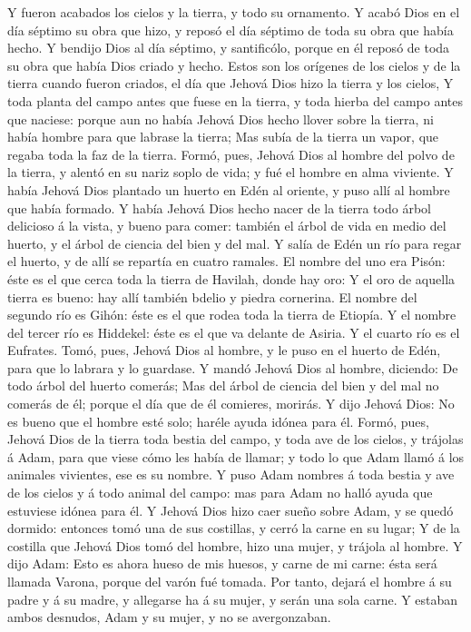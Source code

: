  Y fueron acabados los cielos y la tierra, y todo su
ornamento.  Y acabó Dios en el día séptimo su obra que
hizo, y reposó el día séptimo de toda su obra que había hecho.
 Y bendijo Dios al día séptimo, y santificólo, porque en
él reposó de toda su obra que había Dios criado y hecho. 
Estos son los orígenes de los cielos y de la tierra cuando fueron
criados, el día que Jehová Dios hizo la tierra y los cielos,
 Y toda planta del campo antes que fuese en la tierra, y
toda hierba del campo antes que naciese: porque aun no había Jehová Dios
hecho llover sobre la tierra, ni había hombre para que labrase la
tierra;  Mas subía de la tierra un vapor, que regaba toda
la faz de la tierra.  Formó, pues, Jehová Dios al hombre
del polvo de la tierra, y alentó en su nariz soplo de vida; y fué el
hombre en alma viviente.  Y había Jehová Dios plantado un
huerto en Edén al oriente, y puso allí al hombre que había formado.
 Y había Jehová Dios hecho nacer de la tierra todo árbol
delicioso á la vista, y bueno para comer: también el árbol de vida en
medio del huerto, y el árbol de ciencia del bien y del mal.
 Y salía de Edén un río para regar el huerto, y de allí
se repartía en cuatro ramales.  El nombre del uno era
Pisón: éste es el que cerca toda la tierra de Havilah, donde hay oro:
 Y el oro de aquella tierra es bueno: hay allí también
bdelio y piedra cornerina.  El nombre del segundo río es
Gihón: éste es el que rodea toda la tierra de Etiopía.  Y
el nombre del tercer río es Hiddekel: éste es el que va delante de
Asiria. Y el cuarto río es el Eufrates.  Tomó, pues,
Jehová Dios al hombre, y le puso en el huerto de Edén, para que lo
labrara y lo guardase.  Y mandó Jehová Dios al hombre,
diciendo: De todo árbol del huerto comerás;  Mas del
árbol de ciencia del bien y del mal no comerás de él; porque el día que
de él comieres, morirás.  Y dijo Jehová Dios: No es bueno
que el hombre esté solo; haréle ayuda idónea para él. 
Formó, pues, Jehová Dios de la tierra toda bestia del campo, y toda ave
de los cielos, y trájolas á Adam, para que viese cómo les había de
llamar; y todo lo que Adam llamó á los animales vivientes, ese es su
nombre.  Y puso Adam nombres á toda bestia y ave de los
cielos y á todo animal del campo: mas para Adam no halló ayuda que
estuviese idónea para él.  Y Jehová Dios hizo caer sueño
sobre Adam, y se quedó dormido: entonces tomó una de sus costillas, y
cerró la carne en su lugar;  Y de la costilla que Jehová
Dios tomó del hombre, hizo una mujer, y trájola al hombre.
 Y dijo Adam: Esto es ahora hueso de mis huesos, y carne
de mi carne: ésta será llamada Varona, porque del varón fué tomada.
 Por tanto, dejará el hombre á su padre y á su madre, y
allegarse ha á su mujer, y serán una sola carne.  Y
estaban ambos desnudos, Adam y su mujer, y no se avergonzaban.

